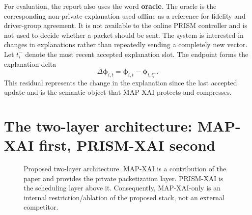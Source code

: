 \documentclass[11pt]{article}
\begin{document}
For evaluation, the report also uses the word \textbf{oracle}. The oracle is the corresponding non-private explanation used offline as a reference for fidelity and driver-group agreement. It is not available to the online PRISM controller and is not used to decide whether a packet should be sent. The system is interested in changes in explanations rather than repeatedly sending a completely new vector. Let $t_i^-$ denote the most recent accepted explanation slot. The endpoint forms the explanation delta
\[
\Delta\boldsymbol{\phi}_{i,t}=\boldsymbol{\phi}_{i,t}-\boldsymbol{\phi}_{i,t_i^-}.
\]
This residual represents the change in the explanation since the last accepted update and is the semantic object that MAP-XAI protects and compresses.

\section{The two-layer architecture: MAP-XAI first, PRISM-XAI second}
\begin{figure}[htbp]
\centering
{}
\caption{Proposed two-layer architecture. MAP-XAI is a contribution of the paper and provides the private packetization layer. PRISM-XAI is the scheduling layer above it. Consequently, MAP-XAI-only is an internal restriction/ablation of the proposed stack, not an external competitor.}
\label{fig:tutorial-stack}
\end{figure}
\end{document}
